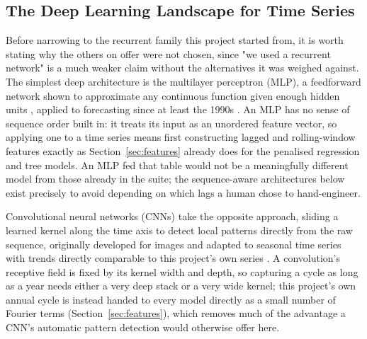 \documentclass[12pt,a4paper]{report}
\begin{document}
\subsection{The Deep Learning Landscape for Time Series}
\label{sec:lit-dl-landscape}

Before narrowing to the recurrent family this project started from, it is
worth stating why the others on offer were not chosen, since "we used a
recurrent network" is a much weaker claim without the alternatives it was
weighed against. The simplest deep architecture is the multilayer perceptron (MLP),
a feedforward network shown to approximate any continuous function given
enough hidden units \citep{hornik1989universal}, applied to forecasting
since at least the 1990s \citep{zhang1998ann}. An MLP has no sense of
sequence order built in: it treats its input as an unordered feature vector,
so applying one to a time series means first constructing lagged and
rolling-window features exactly as Section~\ref{sec:features} already does
for the penalised regression and tree models. An MLP fed that table would
not be a meaningfully different model from those already in the suite; the
sequence-aware architectures below exist precisely to avoid depending on
which lags a human chose to hand-engineer.

Convolutional neural networks (CNNs) take the opposite approach, sliding a
learned kernel along the time axis to detect local patterns directly from
the raw sequence, originally developed for images
\citep{lecun1998cnn} and adapted to seasonal time series with trends
directly comparable to this project's own series \citep{liu2020cnn}. A
convolution's receptive field is fixed by its kernel width and depth, so
capturing a cycle as long as a year needs either a very deep stack or a
very wide kernel; this project's own annual cycle is instead handed to
every model directly as a small number of Fourier terms
(Section~\ref{sec:features}), which removes much of the advantage a CNN's
automatic pattern detection would otherwise offer here.
\end{document}
